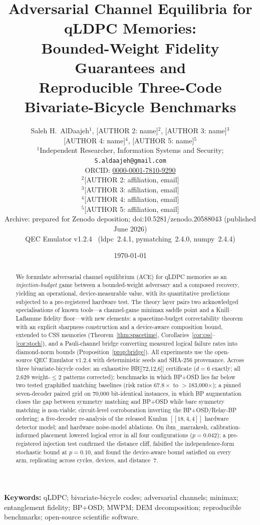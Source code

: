\documentclass[11pt,a4paper]{article}
\title{Adversarial Channel Equilibria for qLDPC Memories:\\
Bounded-Weight Fidelity Guarantees and\\
Reproducible Three-Code Bivariate-Bicycle Benchmarks}
\author{Saleh H.\ AlDaajeh$^{1}$, [AUTHOR 2: name]$^{2}$, [AUTHOR 3: name]$^{3}$\\[2pt]
[AUTHOR 4: name]$^{4}$, [AUTHOR 5: name]$^{5}$\\[4pt]
\small $^{1}$Independent Researcher, Information Systems and Security; \texttt{S.aldaajeh@gmail.com}\\
\small ORCID: \href{https://orcid.org/0000-0001-7810-9290}{0000-0001-7810-9290}\\
\small $^{2}$[AUTHOR 2: affiliation, email]\\
\small $^{3}$[AUTHOR 3: affiliation, email]\\
\small $^{4}$[AUTHOR 4: affiliation, email]\\
\small $^{5}$[AUTHOR 5: affiliation, email]\\[4pt]
\small Archive: prepared for Zenodo deposition; doi:10.5281/zenodo.20588043 (published June 2026)\\[2pt]
\small QEC Emulator v1.2.4~\cite{AlDaajeh2026emulator}
(ldpc~2.4.1, pymatching~2.4.0, numpy~2.4.4)}
\date{\today}
\begin{document}
\maketitle

\begin{abstract}
We formulate adversarial channel equilibrium (ACE) for qLDPC memories
as an \emph{injection-budget} game between a bounded-weight adversary
and a composed recovery, yielding an operational, device-measurable
value, with its quantitative predictions subjected to a pre-registered
hardware test. The theory layer pairs two acknowledged specialisations
of known tools---a channel-game minimax saddle point and a
Knill--Laflamme fidelity floor---with new elements: a spacetime-budget
correctability theorem with an explicit sharpness construction and a
device-aware composition bound, extended to CSS memories
(Theorem~\ref{thm:spacetime},
Corollaries~\ref{cor:css}--\ref{cor:stoch}), and a Pauli-channel bridge
converting measured logical failure rates into diamond-norm bounds
(Proposition~\ref{prop:bridge}). All experiments use the open-source
QEC Emulator v1.2.4 with deterministic seeds and SHA-256 provenance.
Across three bivariate-bicycle codes: an exhaustive BB[[72,12,6]]
certificate ($d=6$ exactly; all 2{,}629 weight-$\le2$ patterns corrected);
benchmarks in which BP+OSD lies far below two tested graphified
matching baselines (risk ratios $67.8\times$ to $>$183{,}000$\times$); a
pinned seven-decoder paired grid on 70{,}000 bit-identical instances,
in which BP augmentation closes the gap between symmetry matching and
BP+OSD while bare symmetry matching is non-viable;
circuit-level corroboration inverting the BP+OSD/Relay-BP ordering; a
five-decoder re-analysis of the released Kunlun $[[18,4,4]]$ hardware
detector model; and hardware noise-model ablations. On
ibm\_marrakesh, calibration-informed placement lowered logical error in
all four configurations ($p=0.042$); a pre-registered
injection test confirmed the distance cliff, falsified the
independence-form stochastic bound at $p=0.10$, and found the
device-aware bound satisfied on every arm, replicating across cycles,
devices, and distance~7.

\end{abstract}

\noindent\textbf{Keywords:} qLDPC; bivariate-bicycle codes; adversarial
channels; minimax; entanglement fidelity; BP+OSD; MWPM; DEM decomposition;
reproducible benchmarks; open-source scientific software.
\end{document}

